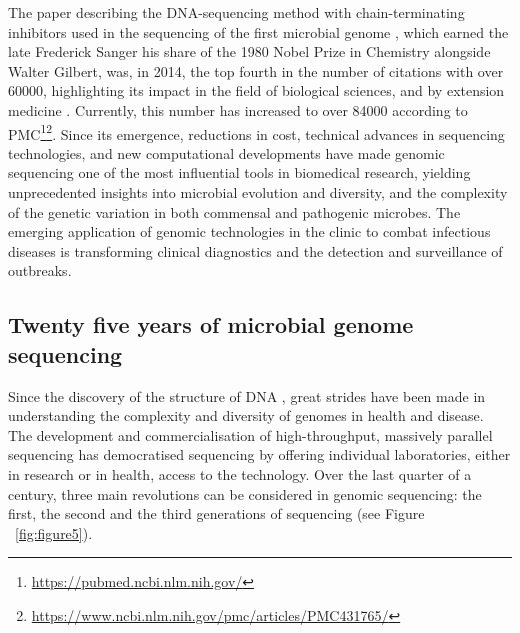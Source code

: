 The paper describing the DNA-sequencing method with chain-terminating inhibitors used in the sequencing of the first microbial genome \citep{sanger_dna_1977}, which earned the late Frederick Sanger his share of the 1980 Nobel Prize in Chemistry alongside Walter Gilbert, was, in 2014, the top fourth in the number of citations with over 60000, highlighting its impact in the field of biological sciences, and by extension medicine \citep{van_noorden_top_2014}. 
Currently, this number has increased to over 84000 according to \ac{PMC}\footnote{\url{https://pubmed.ncbi.nlm.nih.gov/}}\footnote{\url{ https://www.ncbi.nlm.nih.gov/pmc/articles/PMC431765/}}. 
Since its emergence, reductions in cost, technical advances in sequencing technologies, and new computational developments have made genomic sequencing one of the most influential tools in biomedical research, yielding unprecedented insights into microbial evolution and diversity, and the complexity of the genetic variation in both commensal and pathogenic microbes. 
The emerging application of genomic technologies in the clinic to combat infectious diseases is transforming clinical diagnostics and the detection and surveillance of outbreaks. 

\subsection{Twenty five years of microbial genome sequencing} \label{ssec:_intro_sequencing}

Since the discovery of the structure of DNA \citep{watson_molecular_1953}, great strides have been made in understanding the complexity and diversity of genomes in health and disease. 
The development and commercialisation of high-throughput, massively parallel sequencing has democratised sequencing by offering individual laboratories, either in research or in health, access to the technology. 
Over the last quarter of a century, three main revolutions can be considered in genomic sequencing: the first, the second and the third generations of sequencing (see Figure ~\ref{fig:figure5}).

